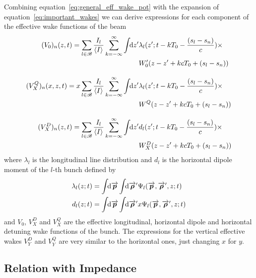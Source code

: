     Combining equation~\eqref{eq:general_eff_wake_pot} with the expansion of equation~\eqref{eq:important_wakes} we can derive expressions for each component of the effective wake functions of the beam
    \begin{align}\label{eq:general_eff_long_wake}
	  	(V_0)_n(z, t) =\nonumber \sum_{l\in\mathscr{B}}\frac{I_l}{\left\langle I \right\rangle_{{}}}\sum_{k=-\infty}^\infty\int\!\!\text{d}z' 
	  			&\lambda_l(z'; t-kT_0-\frac{(s_l-s_n)}{c})
				\times\\
				&W'_0(z-z' + kcT_0 + (s_l-s_n))\\[3mm]
	  	(V^Q_X)_n(x, z, t) =\nonumber x\sum_{l\in\mathscr{B}}\frac{I_l}{\left\langle I \right\rangle_{{}}}\sum_{k=-\infty}^\infty\int\!\!\text{d}z' 
	  			&\lambda_l(z'; t-kT_0-\frac{(s_l-s_n)}{c})
				\times\\
				&W^Q(z-z' + kcT_0 + (s_l-s_n))\\[3mm]
	  	(V^D_X)_n(z, t) =\nonumber \sum_{l\in\mathscr{B}}\frac{I_l}{\left\langle I \right\rangle_{{}}}\sum_{k=-\infty}^\infty\int\!\!\text{d}z' 
	  			&d_l(z'; t-kT_0-\frac{(s_l-s_n)}{c})
				\times\\
				&W^D_X(z-z' + kcT_0 + (s_l-s_n))
    \end{align}
    where $\lambda_l$ is the longitudinal line distribution and $d_l$ is the horizontal dipole moment of the $l$-th bunch defined by
    \begin{align}
	  	\lambda_l(z; t) = \udefint{\vect{p}}{\udefint{\vect{\rho}'}{
	  			&\Psi_l(\vect{p},\vect{\rho}',z; t)}}\\
	  	d_l(z; t) = \udefint{\vect{p}}{\udefint{\vect{\rho}'}{
	  			&x\Psi_l(\vect{p},\vect{\rho}',z; t)}}
    \end{align}
    and $V_0$, $V^D_X$ and $V^Q_X$ are the effective longitudinal, horizontal dipole and horizontal detuning wake functions of the bunch. The expressions for the vertical effective wakes $V^D_Y$ and $V^Q_Y$ are very similar to the horizontal ones, just changing $x$ for $y$.

\subsection{Relation with Impedance}

